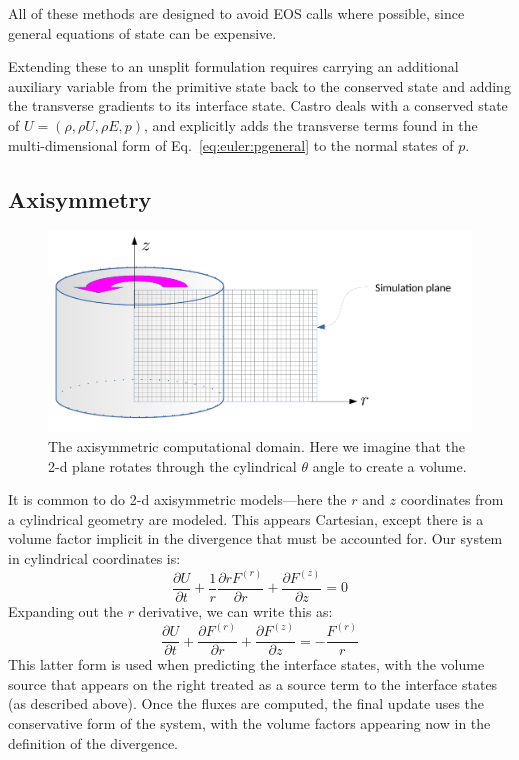 All of these methods are designed to avoid EOS calls where possible,
since general equations of state can be expensive.

Extending these to an unsplit formulation requires carrying an additional
auxiliary variable from the primitive state back to the conserved state
and adding the transverse gradients to its interface state.  Castro
deals with a conserved state of $U = (\rho, \rho U, \rho E, p)$, and
explicitly adds the transverse terms found in the multi-dimensional form
of Eq.~\ref{eq:euler:pgeneral}
to the normal states of $p$.


\subsection{Axisymmetry}

\begin{figure}
\centering
\includegraphics[width=0.8\linewidth]{axisymmetry}
\caption[The axisymmetric computational domain]
{\label{fig:axisymmetri} The axisymmetric computational domain.  Here we
  imagine that the 2-d plane rotates through the cylindrical $\theta$ angle to
  create a volume.}
\end{figure}

It is common to do 2-d axisymmetric models---here
the $r$ and $z$ coordinates from a cylindrical geometry are modeled.  This
appears Cartesian, except there is a volume factor implicit in the
divergence that must be accounted for.  Our system in cylindrical
coordinates is:
\begin{equation}
\frac{\partial U}{\partial t}
  + \frac{1}{r}\frac{\partial r F^{(r)}}{\partial r}
  + \frac{\partial F^{(z)}}{\partial z} = 0
\end{equation}
Expanding out the $r$ derivative, we can write this as:
\begin{equation}
\frac{\partial U}{\partial t}
  + \frac{\partial F^{(r)}}{\partial r}
  + \frac{\partial F^{(z)}}{\partial z} = -\frac{F^{(r)}}{r}
\end{equation}
This latter form is used when predicting the interface states, with
the volume source that appears on the right treated as a source term
to the interface states (as described above).  Once the fluxes are
computed, the final update uses the conservative form of the system,
with the volume factors appearing now in the definition of the
divergence.

